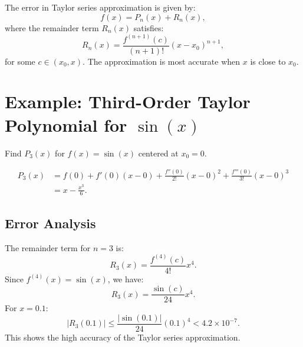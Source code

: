 The error in Taylor series approximation is given by:
\begin{equation*}
    f(x) = P_n(x) + R_n(x),
\end{equation*}
where the remainder term $R_n(x)$ satisfies:
\begin{equation*}
    R_n(x) = \frac{f^{(n+1)}(c)}{(n+1)!} (x - x_0)^{n+1},
\end{equation*}
for some $c \in (x_0, x)$. The approximation is most accurate when $x$ is 
close to $x_0$.

\section{Example: Third-Order Taylor Polynomial for $\sin(x)$}

Find $P_3(x)$ for $f(x) = \sin(x)$ centered at $x_0 = 0$.

\begin{align*}
    P_3(x) &= f(0) + f'(0)(x - 0) + \frac{f''(0)}{2!} (x - 0)^2 + 
             \frac{f'''(0)}{3!} (x - 0)^3 \\
           &= x - \frac{x^3}{6}.
\end{align*}

\subsection{Error Analysis}

The remainder term for $n = 3$ is:
\begin{equation*}
    R_3(x) = \frac{f^{(4)}(c)}{4!} x^4.
\end{equation*}
Since $f^{(4)}(x) = \sin(x)$, we have:
\begin{equation*}
    R_3(x) = \frac{\sin(c)}{24} x^4.
\end{equation*}
For $x = 0.1$:
\begin{equation*}
    |R_3(0.1)| \leq \frac{|\sin(0.1)|}{24} (0.1)^4 < 4.2 \times 10^{-7}.
\end{equation*}
This shows the high accuracy of the Taylor series approximation.
